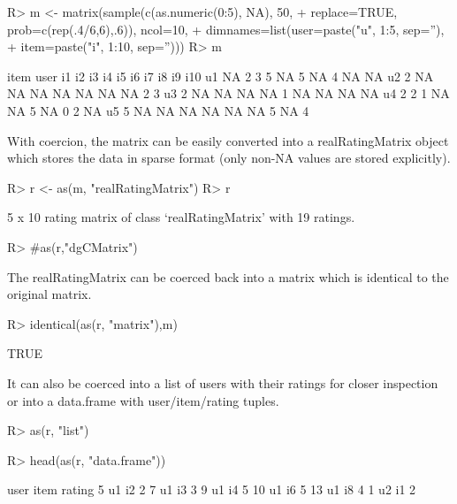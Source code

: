 \documentclass[nojss]{jss}
\begin{document}
\begin{Schunk}
\begin{Sinput}
R> m <- matrix(sample(c(as.numeric(0:5), NA), 50, 
+     replace=TRUE, prob=c(rep(.4/6,6),.6)), ncol=10,
+     dimnames=list(user=paste("u", 1:5, sep=''), 
+ 	item=paste("i", 1:10, sep='')))
R> m
\end{Sinput}
\begin{Soutput}
    item
user i1 i2 i3 i4 i5 i6 i7 i8 i9 i10
  u1 NA  2  3  5 NA  5 NA  4 NA  NA
  u2  2 NA NA NA NA NA NA NA  2   3
  u3  2 NA NA NA NA  1 NA NA NA  NA
  u4  2  2  1 NA NA  5 NA  0  2  NA
  u5  5 NA NA NA NA NA NA  5 NA   4
\end{Soutput}
\end{Schunk}

With coercion, the matrix can be easily converted into 
a realRatingMatrix object which stores the data in sparse 
format (only non-NA values are stored explicitly).

\begin{Schunk}
\begin{Sinput}
R> r <- as(m, "realRatingMatrix")
R> r
\end{Sinput}
\begin{Soutput}
5 x 10 rating matrix of class ‘realRatingMatrix’ with 19 ratings.
\end{Soutput}
\begin{Sinput}
R> #as(r,"dgCMatrix")
\end{Sinput}
\end{Schunk}

The realRatingMatrix can be coerced back into a matrix which is 
identical to the original matrix. 
\begin{Schunk}
\begin{Sinput}
R> identical(as(r, "matrix"),m)
\end{Sinput}
\begin{Soutput}
[1] TRUE
\end{Soutput}
\end{Schunk}


It can also be coerced into a list 
of users with their ratings for closer inspection 
or
into a data.frame with user/item/rating tuples.
\begin{Schunk}
\begin{Sinput}
R> as(r, "list")
\end{Sinput}
\begin{Sinput}
R> head(as(r, "data.frame"))
\end{Sinput}
\begin{Soutput}
   user item rating
5    u1   i2      2
7    u1   i3      3
9    u1   i4      5
10   u1   i6      5
13   u1   i8      4
1    u2   i1      2
\end{Soutput}
\end{Schunk}
\end{document}
